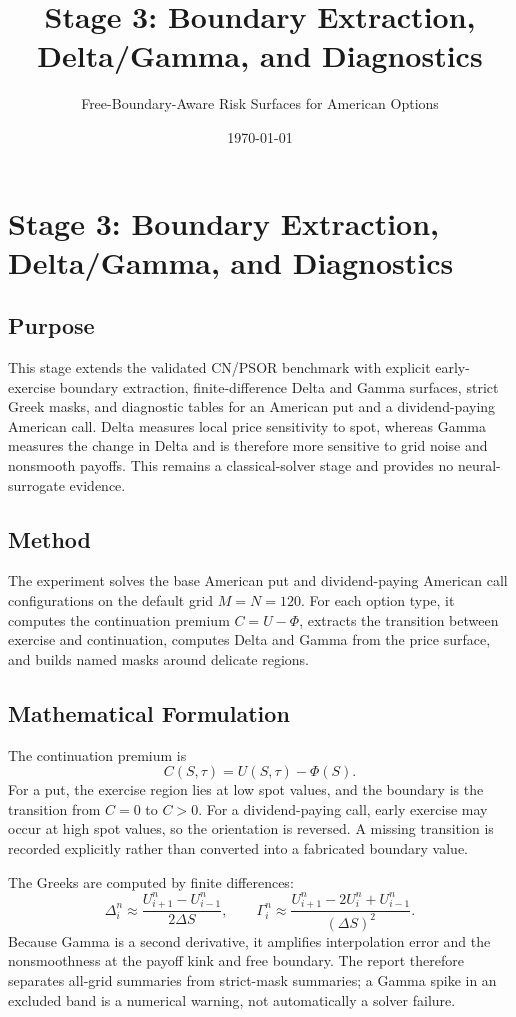 \documentclass[11pt]{article}
\title{Stage 3: Boundary Extraction, Delta/Gamma, and Diagnostics}
\author{Free-Boundary-Aware Risk Surfaces for American Options}
\date{\today}
\begin{document}
\maketitle

\section{Stage 3: Boundary Extraction, Delta/Gamma, and Diagnostics}

\subsection{Purpose}
This stage extends the validated CN/PSOR benchmark with explicit
early-exercise boundary extraction, finite-difference Delta and Gamma surfaces,
strict Greek masks, and diagnostic tables for an American put and a
dividend-paying American call. Delta measures local price sensitivity to spot,
whereas Gamma measures the change in Delta and is therefore more sensitive to
grid noise and nonsmooth payoffs. This remains a classical-solver stage and
provides no neural-surrogate evidence.

\subsection{Method}
The experiment solves the base American put and dividend-paying American call
configurations on the default grid \(M=N=120\). For each option type, it
computes the continuation premium \(C=U-\Phi\), extracts the transition between
exercise and continuation, computes Delta and Gamma from the price surface, and
builds named masks around delicate regions.

\subsection{Mathematical Formulation}
The continuation premium is
\[
C(S,\tau)=U(S,\tau)-\Phi(S).
\]
For a put, the exercise region lies at low spot values, and the boundary is the
transition from \(C=0\) to \(C>0\). For a dividend-paying call, early exercise
may occur at high spot values, so the orientation is reversed. A missing
transition is recorded explicitly rather than converted into a fabricated
boundary value.

The Greeks are computed by finite differences:
\[
\Delta_i^n \approx \frac{U_{i+1}^n-U_{i-1}^n}{2\Delta S},\qquad
\Gamma_i^n \approx \frac{U_{i+1}^n-2U_i^n+U_{i-1}^n}{(\Delta S)^2}.
\]
Because Gamma is a second derivative, it amplifies interpolation error and the
nonsmoothness at the payoff kink and free boundary. The report therefore
separates all-grid summaries from strict-mask summaries; a Gamma spike in an
excluded band is a numerical warning, not automatically a solver failure.
\end{document}
